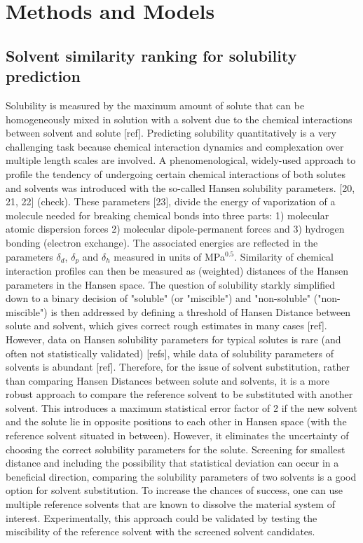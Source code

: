 \documentclass[
  english,        %
  font=times,     %
  onecolumn,      %
]{article}
\begin{document}

\section{Methods and Models}


\subsection*{Solvent similarity ranking for solubility prediction}\label{sec:ranking}

Solubility is measured by the maximum amount of solute that can be homogeneously mixed in solution with a solvent due to the chemical interactions between solvent and solute [ref]. Predicting solubility quantitatively is a very challenging task because chemical interaction dynamics and complexation over multiple length scales are involved. A phenomenological, widely-used approach to profile the tendency of undergoing certain chemical interactions of both solutes and solvents was introduced with the so-called Hansen solubility parameters. [20, 21, 22] (check). These parameters [23], divide the energy of vaporization of a molecule needed for breaking chemical
bonds into three parts: 1) molecular atomic dispersion forces 2) molecular dipole-permanent forces and 3)
hydrogen bonding (electron exchange). The associated energies are reflected in the parameters $\delta_d$, $\delta_p$ and $\delta_h$ measured in units of MPa$^{0.5}$. Similarity of chemical interaction profiles can then be measured as (weighted) distances of the Hansen parameters in the Hansen space. The question of solubility starkly simplified down to a binary decision of "soluble" (or "miscible") and "non-soluble" ("non-miscible") is then addressed by defining a threshold of Hansen Distance between solute and solvent, which gives correct rough estimates in many cases [ref]. However, data on Hansen solubility parameters for typical solutes is rare (and often not statistically validated) [refs], while data of solubility parameters of solvents is abundant [ref]. Therefore, for the issue of solvent substitution, rather than comparing Hansen Distances between solute and solvents, it is a more robust approach to compare the reference solvent to be substituted with another solvent. This introduces a maximum statistical error factor of 2 if the new solvent and the solute lie in opposite positions to each other in Hansen space (with the reference solvent situated in between). However, it eliminates the uncertainty of choosing the correct solubility parameters for the solute. Screening for smallest distance and including the possibility that statistical deviation can occur in a beneficial direction, comparing the solubility parameters of two solvents is a good option for solvent substitution. To increase the chances of success, one can use multiple  reference solvents that are known to dissolve the material system of interest. Experimentally, this approach could be validated by testing the miscibility of the reference solvent with the screened solvent candidates.
\end{document}
